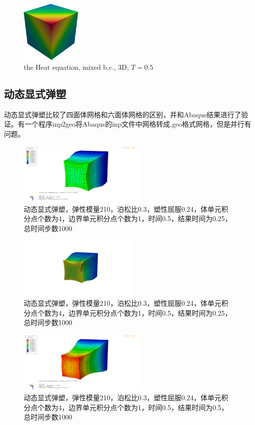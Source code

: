 \begin{figure}[!htbp]
  \centering
  \includegraphics[height=3cm]{fig/4/fig:1.1.2:2.png}
  \caption{   the Heat equation, mixed b.c., 3D, $T=0.5$}
  \label{fig:4.1.2:2}
\end{figure}



\newpage
\subsection{动态显式弹塑}

动态显式弹塑比较了四面体网格和六面体网格的区别，并和Abaqus结果进行了验证。有一个程序inp2geo将Abaqus的inp文件中网格转成.geo格式网格，但是并行有问题。

\begin{figure}[!htbp]
  \centering
  \includegraphics[height=3cm]{fig/4/4.1.5/3.png}
  \caption{动态显式弹塑，弹性模量210，泊松比0.3，塑性屈服0.24，体单元积分点个数为4，边界单元积分点个数为1，时间0.5，结果时间为0.25，总时间步数1000}
  \label{fig:4.1.4:4}
\end{figure}

\begin{figure}[!htbp]
  \centering
  \includegraphics[height=3cm]{fig/4/4.1.5/3-1.png}
  \caption{动态显式弹塑，弹性模量210，泊松比0.3，塑性屈服0.24，体单元积分点个数为4，边界单元积分点个数为1，时间0.5，结果时间为0.25，总时间步数1000}
  \label{fig:4.1.4:4}
\end{figure}

\begin{figure}[!htbp]
  \centering
  \includegraphics[height=3cm]{fig/4/4.1.5/4.png}
  \caption{动态显式弹塑，弹性模量210，泊松比0.3，塑性屈服0.24，体单元积分点个数为4，边界单元积分点个数为1，时间0.5，结果时间为0.5，总时间步数1000}
  \label{fig:4.1.4:4}
\end{figure}

